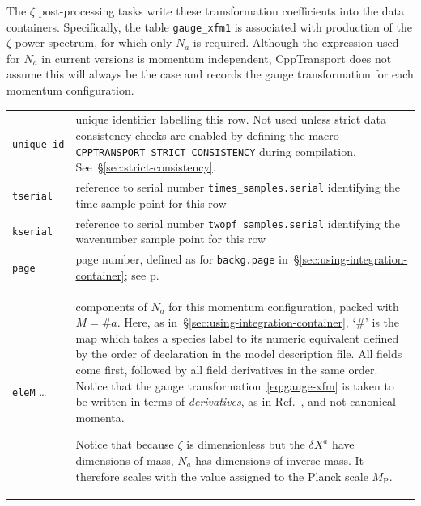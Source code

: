 \documentclass[11pt,a4paper]{article}
\newcommand{\Mp}{M_{\mathrm{P}}}
\newcommand{\packagefont}{\sffamily}
\newcommand{\CppTransport}{{\packagefont CppTransport}}
\newenvironment{sqltablelist}{\renewcommand{\arraystretch}{1.3}\small}{}
\begin{document}
\begin{sqltablelist}
\begin{enumerate}
	The $\zeta$ post-processing tasks write these transformation coefficients into the
	data containers.
	Specifically, the table
	\texttt{gauge_xfm1} is associated with production of the
	$\zeta$ power spectrum,
	for which only $N_a$ is required.
    Although the expression used for $N_a$ in current versions is
    momentum independent, {\CppTransport} does not assume this will always be the
    case and records the gauge transformation for each momentum configuration. \\
    \begin{tabular}{p{2.5cm}p{11.5cm}}
        \texttt{unique_id} & unique identifier labelling this row. Not used
        unless strict data consistency checks are enabled
        by defining the macro
        \texttt{CPPTRANSPORT_STRICT_CONSISTENCY} during
        compilation. See~\S\ref{sec:strict-consistency}. \\
    	\texttt{tserial} & 	reference to serial number \texttt{times_samples.serial}
        identifying the time sample point for this row \\
        \texttt{kserial} & reference to serial number \texttt{twopf_samples.serial}
        identifying the wavenumber sample point for this row \\
        \texttt{page} & page number, defined as for \texttt{backg.page}
        in~\S\ref{sec:using-integration-container}; see p.\pageref{sqltable:backg} \\
        \texttt{eleM} \ldots & components of $N_a$ for this
        momentum configuration, packed with $M= \#a$.
        Here, as in~\S\ref{sec:using-integration-container}, `$\#$'
        is the map which takes a species label to its numeric equivalent
        defined by the order of declaration in the model description file.
        All fields come first, followed by all field derivatives in the same order.
        Notice that
		the gauge transformation~\eqref{eq:gauge-xfm} is taken to be written in
		terms of \emph{derivatives}, as in Ref.~\cite{Dias:2014msa}, and not canonical momenta.
		
		Notice that because $\zeta$ is dimensionless but the $\delta X^a$ have dimensions of
		mass, $N_a$ has dimensions of inverse mass. It therefore scales with the
		value assigned to the Planck scale $\Mp$.
    \end{tabular}
\end{enumerate}
\end{sqltablelist}
\end{document}
